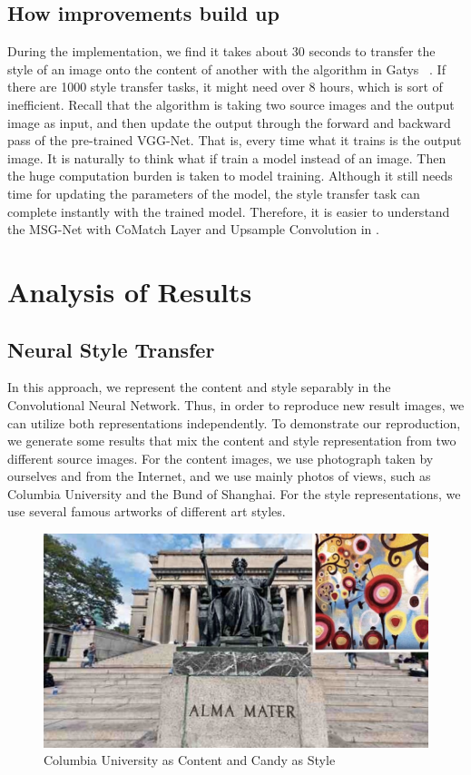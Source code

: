 \documentclass[10pt,twocolumn,letterpaper]{article}
\begin{document}
\subsection{How improvements build up}
During the implementation, we find it takes about 30 seconds to transfer the style of an image onto the content of another with the algorithm in Gatys \etal~\cite{Authors01}. If there are 1000 style transfer tasks, it might need over 8 hours, which is sort of inefficient. Recall that the algorithm is taking two source images and the output image as input, and then update the output through the forward and backward pass of the pre-trained VGG-Net. That is, every time what it trains is the output image. It is naturally to think what if train a model instead of an image. Then the huge computation burden is taken to model training. Although it still needs time for updating the parameters of the model, the style transfer task can complete instantly with the trained model. Therefore, it is easier to understand the MSG-Net with CoMatch Layer and Upsample Convolution in \cite{Authors04}.


\section{Analysis of Results}


\subsection{Neural Style Transfer}

In this approach, we represent the content and style separably in the Convolutional Neural Network. Thus, in order to reproduce new result images, we can utilize both representations independently. To demonstrate our reproduction, we generate some results that mix the content and style representation from two different source images. For the content images, we use photograph taken by ourselves and from the Internet, and we use mainly photos of views, such as Columbia University and the Bund of Shanghai. For the style representations, we use  several famous artworks of different art styles.

\begin{figure}[t]
\begin{center}
\includegraphics[width=0.6\linewidth]{images/columbia.jpg}
\end{center}
\caption{Columbia University as Content and Candy as Style}
\label{fig:long}
\label{fig:onecol}
\label{fig_col_candy}
\end{figure}
\end{document}
